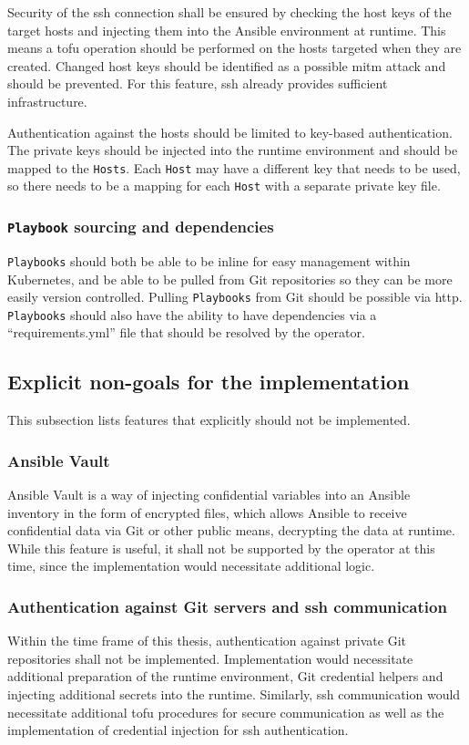 Security of the \gls{ssh} connection shall be ensured by checking the host keys of the target hosts and injecting them into the Ansible environment at runtime.
This means a \gls{tofu} operation should be performed on the hosts targeted when they are created.
Changed host keys should be identified as a possible \gls{mitm} attack and should be prevented.
For this feature, \gls{ssh} already provides sufficient infrastructure.

Authentication against the hosts should be limited to key-based authentication.
The private keys should be injected into the runtime environment and should be mapped to the \texttt{Hosts}.
Each \texttt{Host} may have a different key that needs to be used, so there needs to be a mapping for each \texttt{Host} with a separate private key file.

\subsubsection{\texttt{Playbook} sourcing and dependencies}
\texttt{Playbooks} should both be able to be inline for easy management within Kubernetes, and be able to be pulled from Git repositories so they can be more easily version controlled.
Pulling \texttt{Playbooks} from Git should be possible via \gls{http}.
\texttt{Playbooks} should also have the ability to have dependencies via a \enquote{requirements.yml} file that should be resolved by the operator.

\subsection{Explicit non-goals for the implementation}
This subsection lists features that explicitly should not be implemented.

\clearpage
\subsubsection{Ansible Vault}
Ansible Vault is a way of injecting confidential variables into an Ansible inventory in the form of encrypted files, which allows Ansible to receive confidential data via Git or other public means, decrypting the data at runtime.
While this feature is useful, it shall not be supported by the operator at this time, since the implementation would necessitate additional logic.

\subsubsection{Authentication against Git servers and \gls{ssh} communication}
Within the time frame of this thesis, authentication against private Git repositories shall not be implemented.
Implementation would necessitate additional preparation of the runtime environment, Git credential helpers and injecting additional secrets into the runtime.
Similarly, \gls{ssh} communication would necessitate additional \gls{tofu} procedures for secure communication as well as the implementation of credential injection for \gls{ssh} authentication.
